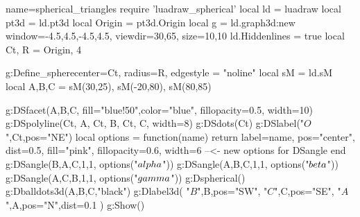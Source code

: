 \documentclass{standalone}
\begin{document}
\begin{luadraw}{name=spherical_triangles}
require 'luadraw_spherical'
local ld = luadraw
local pt3d = ld.pt3d
local Origin = pt3d.Origin
local g = ld.graph3d:new{ window={-4.5,4.5,-4.5,4.5}, viewdir={30,65}, size={10,10} }
ld.Hiddenlines = true
local Ct, R = Origin, 4

g:Define_sphere{center=Ct, radius=R, edgestyle = "noline"}
local sM = ld.sM
local A,B,C = sM(30,25), sM(-20,80), sM(80,85)

g:DSfacet({A,B,C}, {fill="blue!50",color="blue", fillopacity=0.5, width=10})
g:DSpolyline({{Ct, A}, {Ct, B}, {Ct, C}}, {width=8})
g:DSdots(Ct)
g:DSlabel("$O$",Ct,{pos="NE"})
local options = function(name)
    return {label=name, pos="center", dist=0.5, fill="pink", fillopacity=0.6, width=6} --<- new options for DSangle
end
g:DSangle(B,A,C,1,1, options("$\\alpha$"))
g:DSangle(A,B,C,1,1, options("$\\beta$"))
g:DSangle(A,C,B,1,1, options("$\\gamma$"))
g:Dspherical()
g:Dballdots3d({A,B,C},"black")
g:Dlabel3d(
    "$B$",B,{pos="SW"},
    "$C$",C,{pos="SE"},
    "$A$",A,{pos="N",dist=0.1}
)
g:Show()
\end{luadraw}
\end{document}
